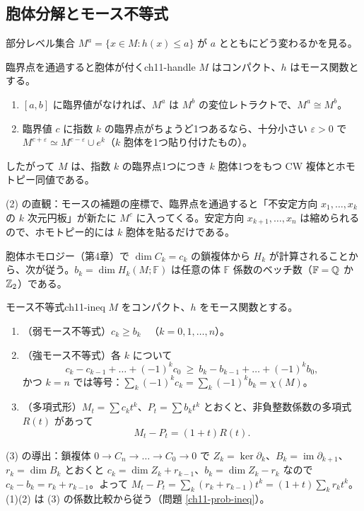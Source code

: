 \subsection{胞体分解とモース不等式}
部分レベル集合 $M^a=\{x\in M:h(x)\le a\}$ が $a$ とともにどう変わるかを見る。

\begin{mythm}{臨界点を通過すると胞体が付く}{ch11-handle}
$M$ はコンパクト、$h$ はモース関数とする。
\begin{enumerate}
\item $[a,b]$ に臨界値がなければ、$M^a$ は $M^b$ の変位レトラクトで、$M^a\cong M^b$。
\item 臨界値 $c$ に指数 $k$ の臨界点がちょうど1つあるなら、十分小さい $\varepsilon>0$ で $M^{c+\varepsilon}\simeq M^{c-\varepsilon}\cup e^k$（$k$ 胞体を1つ貼り付けたもの）。
\end{enumerate}
したがって $M$ は、指数 $k$ の臨界点1つにつき $k$ 胞体1つをもつ CW 複体とホモトピー同値である。
\end{mythm}
\begin{note}
(2) の直観：モースの補題の座標で、臨界点を通過すると「不安定方向 $x_1,\dots,x_k$ の $k$ 次元円板」が新たに $M^c$ に入ってくる。安定方向 $x_{k+1},\dots,x_n$ は縮められるので、ホモトピー的には $k$ 胞体を貼るだけである。
\end{note}

胞体ホモロジー（第4章）で $\dim C_k=c_k$ の鎖複体から $H_k$ が計算されることから、次が従う。$b_k=\dim H_k(M;\mathbb{F})$ は任意の体 $\mathbb{F}$ 係数のベッチ数（$\mathbb{F}=\mathbb{Q}$ か $\mathbb{Z}_2$）である。

\begin{mythm}{モース不等式}{ch11-ineq}
$M$ をコンパクト、$h$ をモース関数とする。
\begin{enumerate}
\item（弱モース不等式）$c_k\ge b_k$ \ （$k=0,1,\dots,n$）。
\item（強モース不等式）各 $k$ について
\[
c_k-c_{k-1}+\dots+(-1)^kc_0\ \ge\ b_k-b_{k-1}+\dots+(-1)^kb_0 ,
\]
かつ $k=n$ では等号：$\displaystyle\sum_k(-1)^kc_k=\sum_k(-1)^kb_k=\chi(M)$。
\item（多項式形）$M_t=\sum c_kt^k$、$P_t=\sum b_kt^k$ とおくと、非負整数係数の多項式 $R(t)$ があって
\[
M_t-P_t=(1+t)R(t).
\]
\end{enumerate}
\end{mythm}
\begin{note}
(3) の導出：鎖複体 $0\to C_n\to\dots\to C_0\to0$ で $Z_k=\ker\partial_k$、$B_k=\operatorname{im}\partial_{k+1}$、$r_k=\dim B_k$ とおくと $c_k=\dim Z_k+r_{k-1}$、$b_k=\dim Z_k-r_k$ なので $c_k-b_k=r_k+r_{k-1}$。よって $M_t-P_t=\sum_k(r_k+r_{k-1})t^k=(1+t)\sum_kr_kt^k$。(1)(2) は (3) の係数比較から従う（問題 \ref{ch11-prob-ineq}）。
\end{note}

